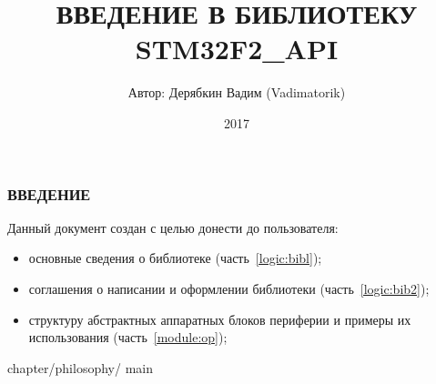 \documentclass[a4paper, 12pt]{report}		%
\begin{document}
	\title {ВВЕДЕНИЕ В БИБЛИОТЕКУ STM32F2\_API}			%
	\author {Автор: Дерябкин Вадим (Vadimatorik)}
	\date {2017}
	\maketitle

\subsubsection{ВВЕДЕНИЕ}
Данный документ создан с целью донести до пользователя:
\begin{itemize}
	\item основные сведения о библиотеке (часть~\ref{logic:bibl});
	\item соглашения о написании и оформлении библиотеки (часть~\ref{logic:bib2});
	\item структуру абстрактных аппаратных блоков периферии и примеры их использования (часть~\ref{module:op});
\end{itemize}

\tableofcontents						%
\clearpage								%

 {chapter/philosophy/}	{main}		%
\end{document}
